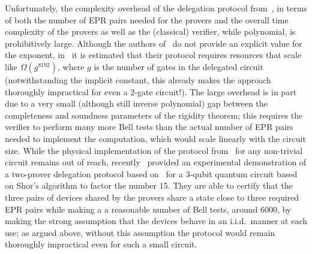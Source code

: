 \documentclass[11pt,letter]{article}
\theoremstyle{remark}
\theoremstyle{definition}
\begin{document}
Unfortunately, the complexity overhead of the delegation protocol from~\cite{reichardt2012classical}, in terms of both the number of EPR pairs needed for the provers and the overall time complexity of the provers as well as the (classical) verifier, while polynomial, is prohibitively large. Although the authors of~\cite{reichardt2012classical} do not provide an explicit value for the exponent, in~\cite{hajdusek2015} it is estimated that their protocol requires resources that scale like $\Omega(g^{8192})$, where $g$ is the number of gates in the delegated circuit (notwithstanding the implicit constant, this already makes the approach thoroughly impractical for even a $2$-gate circuit!).
The large overhead is in part due to a very small (although still inverse polynomial) gap between the completeness and soundness parameters of the rigidity theorem; this requires the verifier to perform many more Bell tests than the actual number of EPR pairs needed to implement the computation, which would scale linearly with the circuit size. 
While the physical implementation of the protocol from~\cite{reichardt2012classical} for any non-trivial circuit remains out of reach, recently~\cite{experiment_ruv} provided an experimental demonstration of a two-prover delegation protocol based on~\cite{reichardt2012classical} for a $3$-qubit quantum circuit based on Shor's algorithm to factor the number $15$. They are able to certify  
 that the three pairs of devices shared by the provers share a state close to three required EPR pairs while making a a reasonable number of Bell tests, around $6000$, by making the strong assumption that the devices behave in an i.i.d.\ manner at each use; as argued above, without this assumption the protocol would remain thoroughly impractical even for such a small circuit. 
\end{document}
